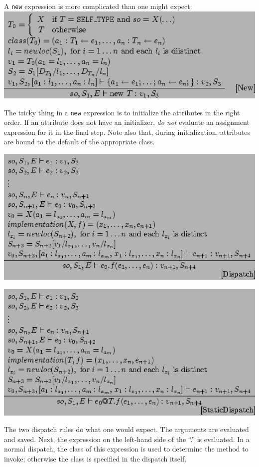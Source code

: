 \documentclass[]{article}
\begin{document}
A \texttt{new} expression is more complicated than one might expect: \\

\includegraphics{img165.png}

The tricky thing in a \texttt{new} expression is to initialize the
attributes in the right order. If an attribute does not have an
initializer, \emph{do not} evaluate an assignment expression for it in
the final step. Note also that, during initialization, attributes are
bound to the default of the appropriate class.

\includegraphics{img166.png}

\includegraphics{img167.png}

The two dispatch rules do what one would expect. The arguments are
evaluated and saved. Next, the expression on the left-hand side of the
``.'' is evaluated. In a normal dispatch, the class of this expression
is used to determine the method to invoke; otherwise the class is
specified in the dispatch itself.
\end{document}
